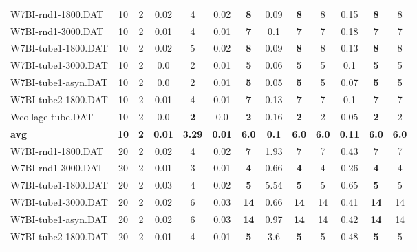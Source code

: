 \begin{table}[h]
{\begin{tabular}{lcccccccccccc}
W7BI-rnd1-1800.DAT & 10 & 2 &  \textcolor{blue2}{0.02} & 4 &  \textcolor{blue2}{0.02} &  \textbf{8} & 0.09 &  \textbf{8} & 8 & 0.15 &  \textbf{8} & 8 \\
W7BI-rnd1-3000.DAT & 10 & 2 &  \textcolor{blue2}{0.01} & 4 &  \textcolor{blue2}{0.01} &  \textbf{7} & 0.1 &  \textbf{7} & 7 & 0.18 &  \textbf{7} & 7 \\
W7BI-tube1-1800.DAT & 10 & 2 &  \textcolor{blue2}{0.02} & 5 &  \textcolor{blue2}{0.02} &  \textbf{8} & 0.09 &  \textbf{8} & 8 & 0.13 &  \textbf{8} & 8 \\
W7BI-tube1-3000.DAT & 10 & 2 &  \textcolor{blue2}{0.0} & 2 & 0.01 &  \textbf{5} & 0.06 &  \textbf{5} & 5 & 0.1 &  \textbf{5} & 5 \\
W7BI-tube1-asyn.DAT & 10 & 2 &  \textcolor{blue2}{0.0} & 2 & 0.01 &  \textbf{5} & 0.05 &  \textbf{5} & 5 & 0.07 &  \textbf{5} & 5 \\
W7BI-tube2-1800.DAT & 10 & 2 &  \textcolor{blue2}{0.01} & 4 &  \textcolor{blue2}{0.01} &  \textbf{7} & 0.13 &  \textbf{7} & 7 & 0.1 &  \textbf{7} & 7 \\
Wcollage-tube.DAT & 10 & 2 &  \textcolor{blue2}{0.0} &  \textbf{2} &  \textcolor{blue2}{0.0} &  \textbf{2} & 0.16 &  \textbf{2} & 2 & 0.05 &  \textbf{2} & 2 \\
\cline{1-13} \textbf{avg} & \textbf{10} & \textbf{2} & \textbf{0.01} & \textbf{3.29} & \textbf{0.01} & \textbf{6.0} & \textbf{0.1} & \textbf{6.0} & \textbf{6.0} & \textbf{0.11} & \textbf{6.0} & \textbf{6.0} \\ \cline{1-13}
W7BI-rnd1-1800.DAT & 20 & 2 &  \textcolor{blue2}{0.02} & 4 &  \textcolor{blue2}{0.02} &  \textbf{7} & 1.93 &  \textbf{7} & 7 & 0.43 &  \textbf{7} & 7 \\
W7BI-rnd1-3000.DAT & 20 & 2 &  \textcolor{blue2}{0.01} & 3 &  \textcolor{blue2}{0.01} &  \textbf{4} & 0.66 &  \textbf{4} & 4 & 0.26 &  \textbf{4} & 4 \\
W7BI-tube1-1800.DAT & 20 & 2 & 0.03 & 4 &  \textcolor{blue2}{0.02} &  \textbf{5} & 5.54 &  \textbf{5} & 5 & 0.65 &  \textbf{5} & 5 \\
W7BI-tube1-3000.DAT & 20 & 2 &  \textcolor{blue2}{0.02} & 6 & 0.03 &  \textbf{14} & 0.66 &  \textbf{14} & 14 & 0.41 &  \textbf{14} & 14 \\
W7BI-tube1-asyn.DAT & 20 & 2 &  \textcolor{blue2}{0.02} & 6 & 0.03 &  \textbf{14} & 0.97 &  \textbf{14} & 14 & 0.42 &  \textbf{14} & 14 \\
W7BI-tube2-1800.DAT & 20 & 2 &  \textcolor{blue2}{0.01} & 4 &  \textcolor{blue2}{0.01} &  \textbf{5} & 3.6 &  \textbf{5} & 5 & 0.48 &  \textbf{5} & 5 \\

\end{tabular}}
\end{table}
